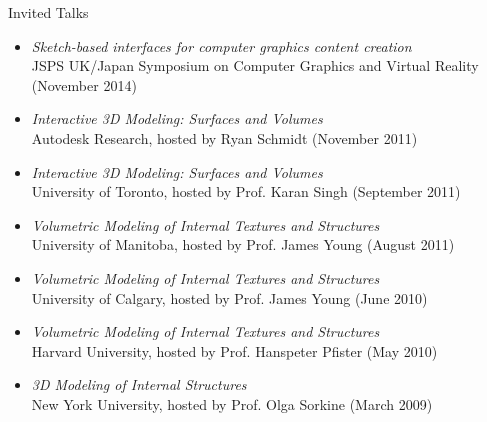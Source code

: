 {\Large\sc Invited Talks}
\vspace{-3mm}
\begin{itemize}
\item {\it Sketch-based interfaces for computer graphics content creation}\\
JSPS UK/Japan Symposium on Computer Graphics and Virtual Reality (November 2014)
\item {\it Interactive 3D Modeling: Surfaces and Volumes}\\
Autodesk Research, hosted by Ryan Schmidt (November 2011)
\item {\it Interactive 3D Modeling: Surfaces and Volumes}\\
University of Toronto, hosted by Prof. Karan Singh (September 2011)
\item {\it Volumetric Modeling of Internal Textures and Structures}\\
University of Manitoba, hosted by Prof. James Young (August 2011)
\item {\it Volumetric Modeling of Internal Textures and Structures}\\
University of Calgary, hosted by Prof. James Young (June 2010)
\item {\it Volumetric Modeling of Internal Textures and Structures}\\
Harvard University, hosted by Prof. Hanspeter Pfister (May 2010)
\item {\it 3D Modeling of Internal Structures}\\
New York University, hosted by Prof. Olga Sorkine (March 2009)
\end{itemize}
